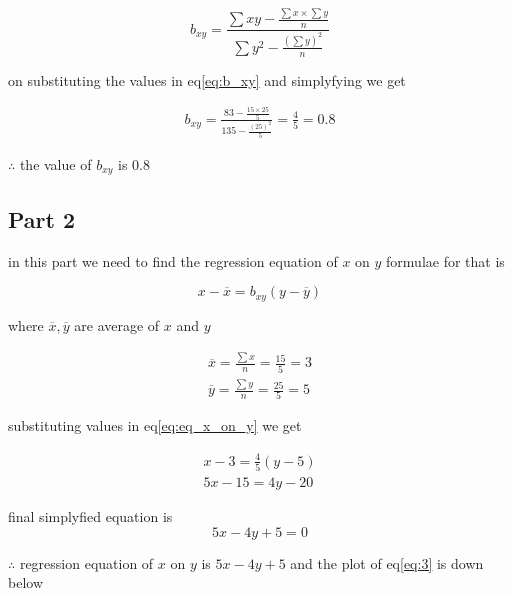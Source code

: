 \documentclass[journal,12pt,twocolumn]{IEEEtran}
\begin{document}
\begin{flushleft}
      \begin{equation}
          \label{eq:b_xy}
          b_{xy}=\frac{\sum xy-\frac{{\sum x}\times  {\sum y}}{n} }{\sum y^{2}-\frac{(\sum y)^{2}}{n} }
      \end{equation}
      
   on substituting the values in eq\eqref{eq:b_xy} and simplyfying  we get 
 
      \begin{align}
          b_{xy}=\frac{83-\frac{15\times25}{5}}{135-\frac{(25)^{2}}{5} } = \frac{4}{5} = 0.8
      \end{align}
     
$\therefore$ the value of $b_{xy}$ is 0.8
 
 
 
 
\subsection*{\textbf{Part 2}}
 in this part we need to find the regression equation of $x$ on $y$
 \newline
 formulae for that is 
 
       \begin{equation}
           \label{eq:eq_x_on_y}
           x-\overline{x} = b_{xy}(y-\overline{y})
       \end{equation}
       
  where $\overline{x},\overline{y}$ are average of $x$ and $y$
 
       \begin{align}
           \overline{x} = \frac{\sum x}{n} = \frac{15}{5} = 3 \\
           \overline{y} = \frac{\sum y}{n} = \frac{25}{5} = 5
       \end{align}
    
  substituting values in eq\eqref{eq:eq_x_on_y} we get 
 
      \begin{align}
          x-3 = \frac{4}{5}(y-5) \\
          5x - 15 = 4y - 20 
      \end{align}
      
   final simplyfied equation is 
      \begin{equation}
          \label{eq:3}
          5x - 4y + 5 = 0
    \end{equation}
    
    
    
$\therefore$ regression equation of $x$ on $y$ is $5x-4y+5$ and the plot of eq\eqref{eq:3} is down below




\end{flushleft}
\end{document}
